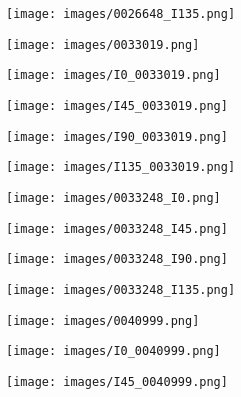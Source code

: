 \begin{figure}
\begin{subfigure}{.11\textwidth}
		\centering
		\texttt{[image: images/0026648\_I135.png]}
	\end{subfigure}%
	\begin{subfigure}{.105\textwidth}
		\centering
		\texttt{[image: images/0033019.png]}
	\end{subfigure}%
	\begin{subfigure}{.105\textwidth}
		\centering
		\texttt{[image: images/I0\_0033019.png]}
	\end{subfigure}%
	\begin{subfigure}{.105\textwidth}
		\centering
		\texttt{[image: images/I45\_0033019.png]}
	\end{subfigure}%
	\begin{subfigure}{.105\textwidth}
		\centering
		\texttt{[image: images/I90\_0033019.png]}
	\end{subfigure}%
	\begin{subfigure}{.105\textwidth}
		\centering
		\texttt{[image: images/I135\_0033019.png]}
	\end{subfigure}
	\begin{subfigure}{.11\textwidth}
		\centering
		\texttt{[image: images/0033248\_I0.png]}
	\end{subfigure}%
	\begin{subfigure}{.11\textwidth}
		\centering
		\texttt{[image: images/0033248\_I45.png]}
	\end{subfigure}%
	\begin{subfigure}{.11\textwidth}
		\centering
		\texttt{[image: images/0033248\_I90.png]}
	\end{subfigure}%
	\begin{subfigure}{.11\textwidth}
		\centering
		\texttt{[image: images/0033248\_I135.png]}
	\end{subfigure}%
	\begin{subfigure}{.105\textwidth}
		\centering
		\texttt{[image: images/0040999.png]}
	\end{subfigure}%
	\begin{subfigure}{.105\textwidth}
		\centering
		\texttt{[image: images/I0\_0040999.png]}
	\end{subfigure}%
	\begin{subfigure}{.105\textwidth}
		\centering
		\texttt{[image: images/I45\_0040999.png]}
	\end{subfigure}%

\end{figure}
